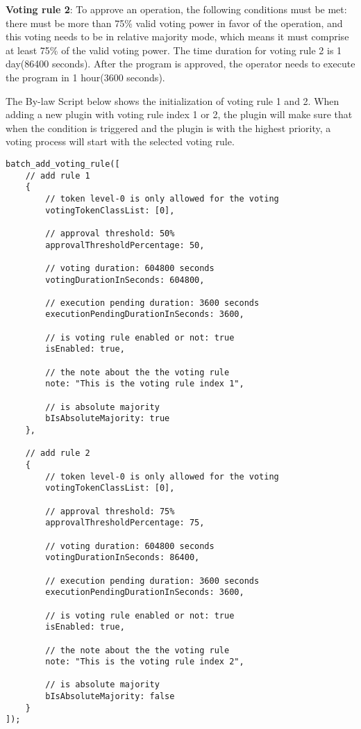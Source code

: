\documentclass[main.tex]{subfiles}
\begin{document}
\textbf{Voting rule 2}: To approve an operation, the following conditions must be met: there must be more than 75\% valid voting power in favor of the operation, and this voting needs to be in relative majority mode, which means it must comprise at least 75\% of the valid voting power. The time duration for voting rule 2 is 1 day(86400 seconds). After the program is approved, the operator needs to execute the program in 1 hour(3600 seconds).

The By-law Script below shows the initialization of voting rule 1 and 2. When adding a new plugin with voting rule index 1 or 2, the plugin will make sure that when the condition is triggered and the plugin is with the highest priority, a voting process will start with the selected voting rule.

\begin{verbatim}
batch_add_voting_rule([
    // add rule 1 
    {
        // token level-0 is only allowed for the voting
        votingTokenClassList: [0], 

        // approval threshold: 50%
        approvalThresholdPercentage: 50,

        // voting duration: 604800 seconds
        votingDurationInSeconds: 604800,

        // execution pending duration: 3600 seconds
        executionPendingDurationInSeconds: 3600,

        // is voting rule enabled or not: true
        isEnabled: true,

        // the note about the the voting rule
        note: "This is the voting rule index 1",

        // is absolute majority
        bIsAbsoluteMajority: true
    },

    // add rule 2
    {
        // token level-0 is only allowed for the voting
        votingTokenClassList: [0], 

        // approval threshold: 75%
        approvalThresholdPercentage: 75,

        // voting duration: 604800 seconds
        votingDurationInSeconds: 86400,

        // execution pending duration: 3600 seconds
        executionPendingDurationInSeconds: 3600,

        // is voting rule enabled or not: true
        isEnabled: true,

        // the note about the the voting rule
        note: "This is the voting rule index 2",

        // is absolute majority
        bIsAbsoluteMajority: false
    }
]);

\end{verbatim}
\end{document}
